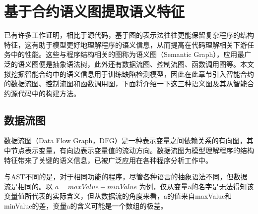 

\section{基于合约语义图提取语义特征}

已有许多工作证明，相比于源代码，基于图的表示法往往更能保留复杂程序的结构特征\cite{allamanis2017learning}，这有助于模型更好地理解程序的语义信息，从而提高在代码理解相关下游任务中的性能。这些与程序结构相关的图称为语义图（Semantic Graph），应用最广泛的语义图便是抽象语法树，此外还有数据流图、控制流图、函数调用图等。本文拟挖掘智能合约中的语义信息用于训练缺陷检测模型，因此在此章节引入智能合约的数据流图、控制流图和函数调用图，下面将介绍一下这三种语义图及其从智能合约源代码中的构建方法。

\subsection{数据流图}
数据流图（Data Flow Graph，DFG）是一种表示变量之间依赖关系的有向图，其中节点表示变量，有向边表示变量值的流动方向。数据流图为模型理解程序的结构特征带来了关键的语义信息，已被广泛应用在各种程序分析工作中\cite{hellendoorn2019global,allamanis2018learning,guo2020graphcodebert}。

与AST不同的是，对于相同功能的程序，尽管各种语言的抽象语法不同，但数据流是相同的。以 $a=maxValue-minValue$ 为例，仅从变量a的名字是无法得知该变量值所代表的实际含义，但从数据流的角度来看，a的值来自maxValue和minValue的差，变量a的含义可能是一个数组的极差。

